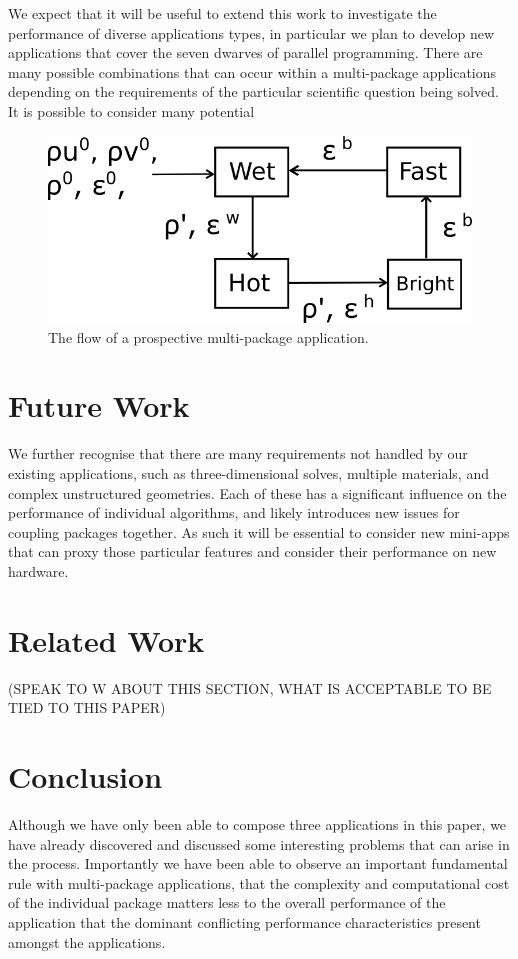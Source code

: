 \documentclass[runningheads,a4paper]{llncs}
\begin{document}
We expect that it will be useful to extend this work to investigate the performance of diverse applications types, in particular we plan to develop new applications that cover the seven dwarves of parallel programming. There are many possible combinations that can occur within a multi-package applications depending on the requirements of the particular scientific question being solved. It is possible to consider many potential 

\begin{figure}
  \centering
  \includegraphics[width=0.6\linewidth]{all-four-flow}
  \caption{The flow of a prospective multi-package application.}
  \label{fig:multi-package-flow}
\end{figure}

\section{Future Work}

We further recognise that there are many requirements not handled by our existing applications, such as three-dimensional solves, multiple materials, and complex unstructured geometries. Each of these has a significant influence on the performance of individual algorithms, and likely introduces new issues for coupling packages together. As such it will be essential to consider new mini-apps that can proxy those particular features and consider their performance on new hardware.

\section{Related Work}

(SPEAK TO W ABOUT THIS SECTION, WHAT IS ACCEPTABLE TO BE TIED TO THIS PAPER)

\section{Conclusion}

Although we have only been able to compose three applications in this paper, we have already discovered and discussed some interesting problems that can arise in the process. Importantly we have been able to observe an important fundamental rule with multi-package applications, that the complexity and computational cost of the individual package matters less to the overall performance of the application that the dominant conflicting performance characteristics present amongst the applications.



\end{document}
